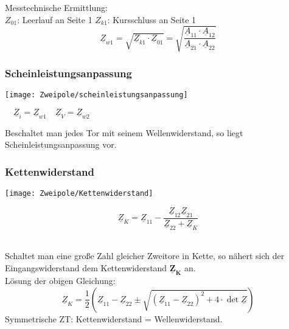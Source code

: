 Messtechnische Ermittlung:\\
$Z_{01}$: Leerlauf an Seite 1 \qquad $Z_{k1}$: Kursschluss an Seite 1
    \begin{equation*}
    \underline{Z}_{w1} = \sqrt{\underline{Z}_{k1}\cdot\underline{Z}_{01}}=\sqrt{\frac{\underline{A}_{11}\cdot\underline{A}_{12}}{\underline{A}_{21}\cdot\underline{A}_{22}}}
    \end{equation*}
    
\subsubsection{Scheinleistungsanpassung}
\begin{minipage}{0.55\columnwidth}
	\texttt{[image: Zweipole/scheinleistungsanpassung]}
\end{minipage}
\begin{minipage}{0.45\columnwidth}
$\quad \underline{Z}_i = \underline{Z}_{w1} \quad \underline{Z}_V=\underline{Z}_{w2}
$
\end{minipage}

Beschaltet man jedes Tor mit seinem Wellenwiderstand, so liegt Scheinleistungsanpassung vor.

\subsubsection{Kettenwiderstand}
\begin{minipage}{0.5\columnwidth}
	\texttt{[image: Zweipole/Kettenwiderstand]}
\end{minipage}
\begin{minipage}[b]{0.5\columnwidth}
	$$
	\underline{Z}_K = \underline{Z}_{11} - \frac{\underline{Z}_{12}\underline{Z}_{21}}{\underline{Z}_{22}+\underline{Z}_K}
	$$
\end{minipage}
\\
\small
Schaltet man eine große Zahl gleicher Zweitore in Kette, so nähert sich der
Eingangswiderstand dem Kettenwiderstand $\mathbf{\underline{Z}_K}$ an.\\
L\"osung der obigen Gleichung:
\[
    \underline{Z}_K = \frac{1}{2}(\underline{Z}_{11} - \underline{Z}_{22} \pm \sqrt{(\underline{Z}_{11}-\underline{Z}_{22})^2+4\cdot\operatorname{det}\underline{Z}})
\]
Symmetrische ZT: Kettenwiderstand = Wellenwiderstand.
\normalsize
